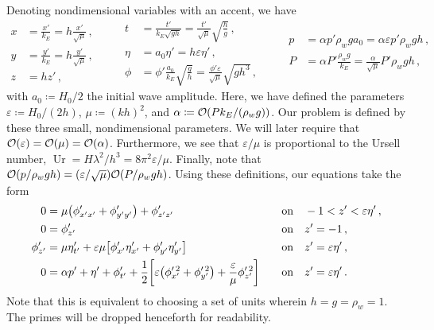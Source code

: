 \documentclass{jfm}
\DeclareMathOperator{\Ur}{Ur}
\renewcommand*{\epsilon}{\varepsilon}
\begin{document}
Denoting nondimensional variables with an accent, we have
\begin{equation*}
  \begin{aligned}
  x &= \frac{x'}{k_E} = h \frac{x'}{\sqrt{\mu}}\,, \\
  y &= \frac{y'}{k_E} = h \frac{y'}{\sqrt{\mu}}\,, \\
  z &= h z' \,,
  \end{aligned}
  \qquad
  \begin{aligned}
  t &= \frac{t'}{k_E\sqrt{g h}}
    = \frac{t'}{\sqrt{\mu}} \sqrt{\frac{h}{g}} \,, \\
  \eta &= a_0 \eta' = h \epsilon \eta' \,, \\
  \phi &= \phi'\frac{a_0}{k_E}\sqrt{\frac{g}{h}}
    = \frac{\phi'\epsilon}{\sqrt{\mu}}\sqrt{g h^3} \,,
  \end{aligned}
  \qquad
  \begin{aligned}
  p &= \alpha p' \rho_w g a_0
    = \alpha \epsilon p' \rho_w g h \,, \\
  P &= \alpha P' \frac{\rho_w g}{k_E}
    = \frac{\alpha}{\sqrt{\mu}} P' \rho_w g h \,,
  \end{aligned}
\end{equation*}
with $a_0 \coloneqq H_0/2$ the initial wave amplitude.
Here, we have defined the parameters $\epsilon \coloneqq H_0/(2h)$, $\mu
\coloneqq (kh)^2$, and $\alpha \coloneqq \order{P k_E/(\rho_w g)}$.
Our problem is defined by these three small, nondimensional parameters.
We will later require that $\order{\epsilon} = \order{\mu} =
\order{\alpha}$.
Furthermore, we see that $\epsilon/\mu$ is proportional to the Ursell
number, $\Ur = H \lambda^2/h^3 = 8 \pi^2 \epsilon/\mu$.
Finally, note that $\order{p/\rho_w g h} = (\epsilon/\sqrt{\mu})
\order{P/\rho_w g h}$.
Using these definitions, our equations take the form
\begin{alignat}{2}
  0 &= \mu \pqty{\phi'_{x'x'} + \phi'_{y'y'}} + \phi'_{z'z'} &&\qq{on}
    -1 < z' < \epsilon \eta' \,, \label{eq:laplace_nondim} \\
  0 &= \phi'_{z'} &&\qq{on} z'=-1 \,, \label{eq:bottom_bc_nondim} \\
  \phi'_{z'} &= \mu \eta'_{t'} +
    \epsilon \mu \bqty{\phi'_{x'} \eta'_{x'} + \phi'_{y'} \eta'_{y'}}
    &&\qq{on} z' = \epsilon \eta' \,, \label{eq:kinematic_bc_nondim} \\
  0 &= \alpha p' +  \eta' + \phi'_{t'} + \frac{1}{2}
    \bqty{\epsilon \pqty{\phi_{x'}^{\prime \, 2} + \phi_{y'}^{\prime \,
    2}} +  \frac{\epsilon}{\mu} \phi_{z'}^{\prime \, 2}} &&\qq{on} z'=
    \epsilon \eta' \,.  \label{eq:dynamic_bc_nondim}
\end{alignat}
Note that this is equivalent to choosing a set of units wherein $h = g =
\rho_w = 1$.
The primes will be dropped henceforth for readability.
\end{document}

